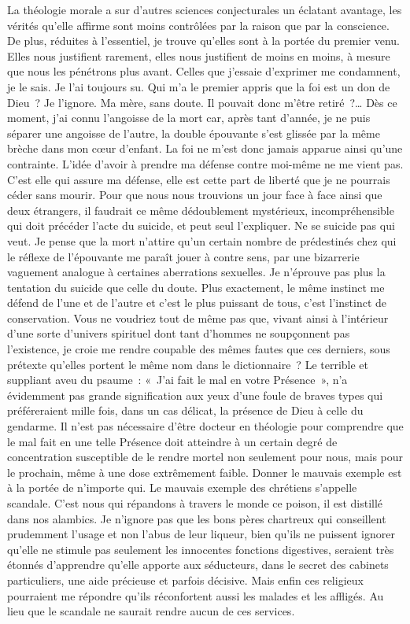 \documentclass[french,twoside]{book} %
\begin{document}
La théologie morale a sur d’autres sciences conjecturales un éclatant avantage, les vérités qu’elle affirme sont moins contrôlées par la raison que par la conscience. De plus, réduites à l’essentiel, je trouve qu’elles sont à la portée du premier venu. Elles nous justifient rarement, elles nous justifient de moins en moins, à mesure que nous les pénétrons plus avant. Celles que j’essaie d’exprimer me condamnent, je le sais. Je l’ai toujours su. Qui m’a le premier appris que la foi est un don de Dieu ? Je l’ignore. Ma mère, sans doute. Il pouvait donc m’être retiré ?… Dès ce moment, j’ai connu l’angoisse de la mort car, après tant d’année, je ne puis séparer une angoisse de l’autre, la double épouvante s’est glissée par la même brèche dans mon cœur d’enfant. La foi ne m’est donc jamais apparue ainsi qu’une contrainte. L’idée d’avoir à prendre ma défense contre moi-même ne me vient pas. C’est elle qui assure ma défense, elle est cette part de liberté que je ne pourrais céder sans mourir. Pour que nous nous trouvions un jour face à face ainsi que deux étrangers, il faudrait ce même dédoublement mystérieux, incompréhensible qui doit précéder l’acte du suicide, et peut seul l’expliquer. Ne se suicide pas qui veut. Je pense que la mort n’attire qu’un certain nombre de prédestinés chez qui le réflexe de l’épouvante me paraît jouer à contre sens, par une bizarrerie vaguement analogue à certaines aberrations sexuelles. Je n’éprouve pas plus la tentation du suicide que celle du doute. Plus exactement, le même instinct me défend de l’une et de l’autre et c’est le plus puissant de tous, c’est l’instinct de conservation. Vous ne voudriez tout de même pas que, vivant ainsi à l’intérieur d’une sorte d’univers spirituel dont tant d’hommes ne soupçonnent pas l’existence, je croie me rendre coupable des mêmes fautes que ces derniers, sous prétexte qu’elles portent le même nom dans le dictionnaire ? Le terrible et suppliant aveu du psaume : « J’ai fait le mal en votre Présence », n’a évidemment pas grande signification aux yeux d’une foule de braves types qui préféreraient mille fois, dans un cas délicat, la présence de Dieu à celle du gendarme. Il n’est pas nécessaire d’être docteur en théologie pour comprendre que le mal fait en une telle Présence doit atteindre à un certain degré de concentration susceptible de le rendre mortel non seulement pour nous, mais pour le prochain, même à une dose extrêmement faible. Donner le mauvais exemple est à la portée de n’importe qui. Le mauvais exemple des chrétiens s’appelle scandale. C’est nous qui répandons à travers le monde ce poison, il est distillé dans nos alambics. Je n’ignore pas que les bons pères chartreux qui conseillent prudemment l’usage et non l’abus de leur liqueur, bien qu’ils ne puissent ignorer qu’elle ne stimule pas seulement les innocentes fonctions digestives, seraient très étonnés d’apprendre qu’elle apporte aux séducteurs, dans le secret des cabinets particuliers, une aide précieuse et parfois décisive. Mais enfin ces religieux pourraient me répondre qu’ils réconfortent aussi les malades et les affligés. Au lieu que le scandale ne saurait rendre aucun de ces services.\par
 \par
\end{document}
